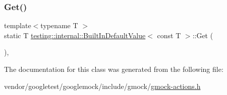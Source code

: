 \mbox{\label{classtesting_1_1internal_1_1_built_in_default_value_3_01const_01_t_01_4_a5996754952ecbcc5da77a2cebd4722de}} 
\subsubsection{\texorpdfstring{Get()}{Get()}}
{\footnotesize\ttfamily template$<$typename T $>$ \\
static T \hyperlink{classtesting_1_1internal_1_1_built_in_default_value}{testing\+::internal\+::\+Built\+In\+Default\+Value}$<$ const T $>$\+::Get (\begin{DoxyParamCaption}{ }\end{DoxyParamCaption})\hspace{0.3cm}{\ttfamily [inline]}, {\ttfamily [static]}}



The documentation for this class was generated from the following file\+:\begin{DoxyCompactItemize}
\item 
vendor/googletest/googlemock/include/gmock/\hyperlink{gmock-actions_8h}{gmock-\/actions.\+h}\end{DoxyCompactItemize}

